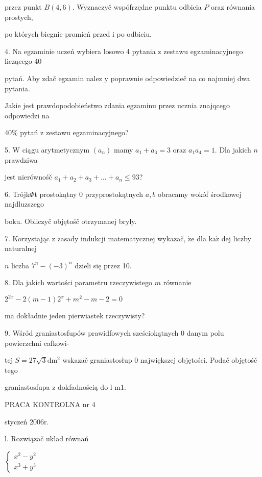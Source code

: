 \documentclass[a4paper,12pt]{article}
\begin{document}
przez punkt $B(4,6)$. Wyznaczyč wspófrzędne punktu odbicia $P$ oraz równania prostych,

po których biegnie promień przed $\mathrm{i}$ po odbiciu.

4. Na egzaminie uczeń wybiera losowo 4 pytania $\mathrm{z}$ zestawu egzaminacyjnego liczącego 40

pytań. Aby zdač egzamin nalez $\mathrm{y}$ poprawnie odpowiedzieč na co najmniej dwa pytania.

Jakie jest prawdopodobieństwo zdania egzaminu przez ucznia znajqcego odpowiedzi na

40\% pytań $\mathrm{z}$ zestawu egzaminacyjnego?

5. $\mathrm{W}$ ciągu arytmetycznym $(a_{n})$ mamy $a_{1}+a_{3}=3$ oraz $a_{1}a_{4}=1$. Dla jakich $n$ prawdziwa

jest nierównośč $a_{1}+a_{2}+a_{3}+\ldots+a_{n}\leq 93$?

6. Trójk$\Phi$t prostokątny $0$ przyprostokątnych $a, b$ obracamy wokóf środkowej najdluzszego

boku. Obliczyč objętośč otrzymanej bryly.

7. Korzystając $\mathrm{z}$ zasady indukcji matematycznej wykazač, $\dot{\mathrm{z}}\mathrm{e}$ dla $\mathrm{k}\mathrm{a}\dot{\mathrm{z}}$ dej liczby naturalnej

$n$ liczba $7^{n}-(-3)^{n}$ dzieli się przez 10.

8. Dla jakich wartości parametru rzeczywistego $m$ równanie

$2^{2x}-2(m-1)2^{x}+m^{2}-m-2=0$

ma dokładnie jeden pierwiastek rzeczywisty?

9. Wśród graniastosfupów prawidfowych sześciokątnych $0$ danym polu powierzchni cafkowi-

tej $S=27\sqrt{3}\mathrm{d}\mathrm{m}^{2}$ wskazač graniastosłup $0$ największej objętości. Podač objętośč tego

graniastosfupa $\mathrm{z}$ dokfadnością do l $\mathrm{m}1.$





PRACA KONTROLNA nr 4

styczeń 2006r.

l. Rozwiązač uklad równań

$\left\{\begin{array}{l}
x^{2}-y^{2}\\
x^{3}+y^{3}
\end{array}\right.$
\end{document}
